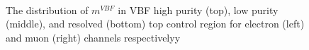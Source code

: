 \begin{figure}[ht]
    \\
	\caption{The distribution of $m^{VBF}$ in VBF high purity (top), low purity (middle), and resolved (bottom) top control region for electron (left) and muon (right) channels respectivelyy}
	\label{Fig:mJJVBFTR}
\end{figure}


